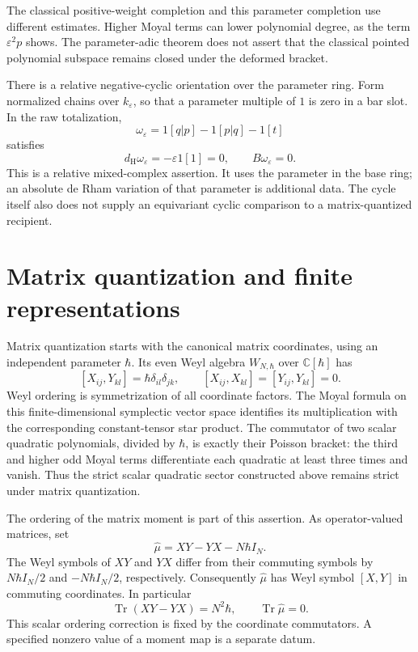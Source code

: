 The classical positive-weight completion and this parameter
completion use different estimates. Higher Moyal terms can
lower polynomial degree, as the term $\varepsilon^2p$ shows.
The parameter-adic theorem does not assert that the classical
pointed polynomial subspace remains closed under the deformed
bracket.

There is a relative negative-cyclic orientation over the
parameter ring. Form normalized chains over $k_\varepsilon$,
so that a parameter multiple of $1$ is zero in a bar slot.
In the raw totalization,
\begin{equation}\label{eq:vol2-relative-quantum-orientation}
 \omega_\varepsilon=1[q|p]-1[p|q]-1[t]
\end{equation}
satisfies
\[
 d_{\mathrm H}\omega_\varepsilon=-\varepsilon1[1]=0,
 \qquad B\omega_\varepsilon=0.
\]
This is a relative mixed-complex assertion. It uses the
parameter in the base ring; an absolute de Rham variation
of that parameter is additional data. The cycle itself also
does not supply an equivariant cyclic comparison to a
matrix-quantized recipient.

\section{Matrix quantization and finite representations}
\label{sec:vol2-two-quantizations}

Matrix quantization starts with the canonical matrix coordinates,
using an independent parameter $\hbar$. Its even Weyl algebra
$W_{N,\hbar}$ over $\mathbb C[\hbar]$ has
\[
 [X_{ij},Y_{kl}]=\hbar\delta_{il}\delta_{jk},\qquad
 [X_{ij},X_{kl}]=[Y_{ij},Y_{kl}]=0.
\]
Weyl ordering is symmetrization of all coordinate factors.
The Moyal formula on this finite-dimensional symplectic vector
space identifies its multiplication with the corresponding
constant-tensor star product. The commutator of two scalar
quadratic polynomials, divided by $\hbar$, is exactly their
Poisson bracket: the third and higher odd Moyal terms
differentiate each quadratic at least three times and vanish.
Thus the strict scalar quadratic sector constructed above
remains strict under matrix quantization.

The ordering of the matrix moment is part of this assertion.
As operator-valued matrices, set
\begin{equation}\label{eq:vol2-ordered-matrix-moment}
 \widehat\mu=XY-YX-N\hbar I_N.
\end{equation}
The Weyl symbols of $XY$ and $YX$ differ from their commuting
symbols by $N\hbar I_N/2$ and $-N\hbar I_N/2$, respectively.
Consequently $\widehat\mu$ has Weyl symbol $[X,Y]$ in
commuting coordinates. In particular
\[
 \operatorname{Tr}(XY-YX)=N^2\hbar,
 \qquad \operatorname{Tr}\widehat\mu=0.
\]
This scalar ordering correction is fixed by the coordinate
commutators. A specified nonzero value of a moment map is a
separate datum.

